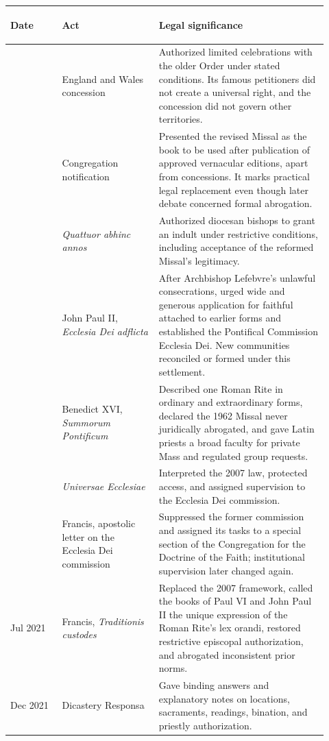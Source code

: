 \begin{longtable}{>{\bfseries\raggedright\arraybackslash}p{0.15\linewidth}>{\raggedright\arraybackslash}p{0.28\linewidth}>{\raggedright\arraybackslash}p{0.49\linewidth}}
\toprule
\textbf{Date} & \textbf{Act} & \textbf{Legal significance}\\
\midrule
\endhead
1971 & England and Wales concession & Authorized limited celebrations with the older Order under stated conditions. Its famous petitioners did not create a universal right, and the concession did not govern other territories.\\
1974 & Congregation notification & Presented the revised Missal as the book to be used after publication of approved vernacular editions, apart from concessions. It marks practical legal replacement even though later debate concerned formal abrogation.\\
1984 & \emph{Quattuor abhinc annos} & Authorized diocesan bishops to grant an indult under restrictive conditions, including acceptance of the reformed Missal's legitimacy.\\
1988 & John Paul II, \emph{Ecclesia Dei adflicta} & After Archbishop Lefebvre's unlawful consecrations, urged wide and generous application for faithful attached to earlier forms and established the Pontifical Commission Ecclesia Dei. New communities reconciled or formed under this settlement.\\
2007 & Benedict XVI, \emph{Summorum Pontificum} & Described one Roman Rite in ordinary and extraordinary forms, declared the 1962 Missal never juridically abrogated, and gave Latin priests a broad faculty for private Mass and regulated group requests.\\
2011 & \emph{Universae Ecclesiae} & Interpreted the 2007 law, protected access, and assigned supervision to the Ecclesia Dei commission.\\
2019 & Francis, apostolic letter on the Ecclesia Dei commission & Suppressed the former commission and assigned its tasks to a special section of the Congregation for the Doctrine of the Faith; institutional supervision later changed again.\\
16 Jul 2021 & Francis, \emph{Traditionis custodes} & Replaced the 2007 framework, called the books of Paul VI and John Paul II the unique expression of the Roman Rite's lex orandi, restored restrictive episcopal authorization, and abrogated inconsistent prior norms.\\
18 Dec 2021 & Dicastery Responsa & Gave binding answers and explanatory notes on locations, sacraments, readings, bination, and priestly authorization.\\

\end{longtable}
